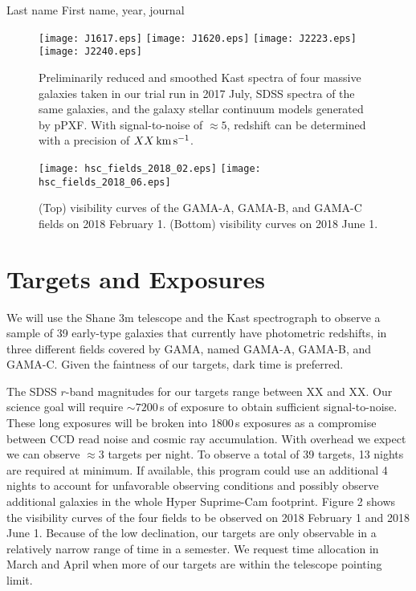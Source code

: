 \documentclass[letterpaper,12pt,dvips]{article}
\newenvironment{my_itemize}{
\begin{itemize}
  \setlength{\itemsep}{1pt}
  \setlength{\parskip}{0pt}
  \setlength{\parsep}{0pt}}{\end{itemize}
}
\begin{document}
\begin{my_itemize}
\item[] Last name First name, year, journal
\end{my_itemize}

\begin{figure}[hbt]
\texttt{[image: J1617.eps]}
\texttt{[image: J1620.eps]}
\texttt{[image: J2223.eps]}
\texttt{[image: J2240.eps]}
\caption{
Preliminarily reduced and smoothed Kast spectra of four massive galaxies taken in our trial run in 
2017 July, SDSS spectra of the same galaxies, and the galaxy stellar continuum models generated by 
pPXF. With signal-to-noise of $\approx5$, redshift can be determined with a precision of 
$XX\,{\rm km\,s^{-1}}$.}
\end{figure}

\begin{figure}[hbt]
\texttt{[image: hsc\_fields\_2018\_02.eps]}
\texttt{[image: hsc\_fields\_2018\_06.eps]}
\caption{(Top) visibility curves of the GAMA-A, GAMA-B, and GAMA-C fields on 2018 February 1. 
(Bottom) visibility curves on 2018 June 1.}
\end{figure}

\clearpage

\section{Targets and Exposures}

We will use the Shane 3m telescope and the Kast spectrograph to observe a sample of 39 early-type 
galaxies that currently have photometric redshifts, in three different fields covered by GAMA, 
named GAMA-A, GAMA-B, and GAMA-C. Given the faintness of our targets, dark time is preferred.  

The SDSS $r$-band magnitudes for our targets range between XX and XX. Our science goal will 
require $\sim7200$\,s of exposure to obtain sufficient signal-to-noise. These long exposures will 
be broken into 1800\,s exposures as a compromise between CCD read noise and cosmic ray 
accumulation. 
With overhead we expect we can observe $\approx3$ targets per night. To observe a total of 39 
targets, 13 nights are required at minimum. If available, this program could use an additional 4 
nights to account for unfavorable observing conditions and possibly observe additional galaxies in 
the whole Hyper Suprime-Cam footprint. Figure 2 shows the visibility curves of the four fields to 
be observed on 2018 February 1 and 2018 June 1. Because of the low declination, our targets are 
only observable in a relatively narrow range of time in a semester. We request time allocation in 
March and April when more of our targets are within the telescope pointing limit. 
\end{document}
